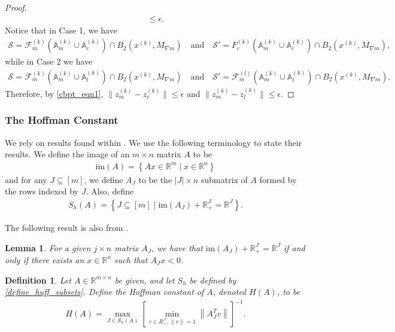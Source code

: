 \documentclass{article}
\newtheorem{definition}[theorem]{Definition}
\newtheorem{lemma}[theorem]{Lemma}
\theoremstyle{case}
\numberwithin{theorem}{subsection}
\newcommand{\feasiblek}{{\mathcal F_m^{(k)}}}
\newcommand{\feasiblel}{{\mathcal F_m^{(l)}}}
\newcommand{\reals}{\mathbb R}
\newcommand{\Rm}{\mathbb R^m}
\newcommand{\Rn}{\mathbb R^n}
\newcommand{\xk}{x^{(k)}}
\newcommand{\truefeasiblek}{{F_c^{(k)}}}
\newcommand{\image}{{\textrm{im}}}
\newcommand{\maxmodelgrad}{{M_{\nabla m}}}
\newcommand{\zmk}{{z_m^{(k)}}}
\newcommand{\zlk}{{z_l^{(k)}}}
\newcommand{\zck}{{z_c^{(k)}}}
\newcommand{\Amk}{{\mathbb A_m^{(k)}}}
\newcommand{\Alk}{{\mathbb A_l^{(k)}}}
\newcommand{\Ack}{{\mathbb A_c^{(k)}}}
\begin{document}
\begin{proof}
\begin{align*}
\le \epsilon.
\end{align*}
Notice that in Case 1, we have 
\begin{align*}
\mathcal S  = \feasiblek\left(\Amk \cup \Ack \right) \cap B_2\left(\xk, \maxmodelgrad\right) \quad \textrm{and} \quad
\mathcal S' = \truefeasiblek\left(\Amk \cup \Ack \right) \cap B_2\left(\xk, \maxmodelgrad\right), 
\end{align*}
while in Case 2 we have 
\begin{align*}
\mathcal S  = \feasiblek\left(\Amk \cup \Alk\right) \cap B_2\left(\xk, \maxmodelgrad\right) \quad \textrm{and} \quad
\mathcal S' = \feasiblel\left(\Amk \cup \Alk \right) \cap B_2\left(\xk, \maxmodelgrad\right).
\end{align*}
Therefore, by \cref{cbpt_eqn1}, $\|\zmk - \zck\| \le \epsilon$ and $\|\zmk - \zlk\| \le \epsilon$.
\end{proof}


\subsubsection{The Hoffman Constant}
\label{introducing_the_hoffman_constant}

We rely on results found within \cite{pena2020new}.
We use the following terminology to state their results.
We define the image of an $m\times n$ matrix $A$ to be
\begin{align}
\image(A) = \left\{Ax \in \Rm \;|\; x \in \Rn \right\} \label{define_image}
\end{align}
and for any $J \subseteq [m]$, we define $A_J$ to be the $|J| \times n$ submatrix of $A$ 
formed by the rows indexed by $J$.
Also, define 
\begin{align}
S_h(A) = \left\{J \subseteq [m] \; | \; \image(A_J) + \reals_+^J = \reals^J \right\}. \label{define_huff_subsets}
\end{align}

The following result is also from \cite{pena2020new}.
\begin{lemma}
For a given $j \times n$ matrix $A_J$, we have that 
$\image(A_J) + \reals_+^J = \reals^J$
if and only if there exists an $x \in \Rn$ such that
$A_J x < 0$.
\end{lemma}

\begin{definition}
\label{hoffman_definition}
Let $A \in \mathbb R^{m \times n}$ be given, and let $S_h$ be defined by \cref{define_huff_subsets}.
Define the Hoffman constant of $A$, denoted $H(A)$, to be
\begin{align*}
H(A) = \max_{J \in \mathcal S_h(A)} \left[\min_{v \in R^J_+, \|v\| = 1}  \left\|A_J^Tv\right\| \right]^{-1}.
\end{align*}
\end{definition}
\end{document}
